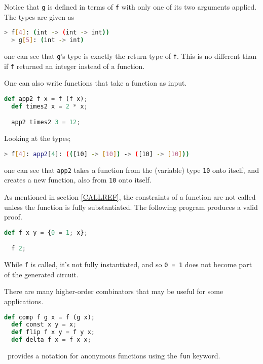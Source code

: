 Notice that \lstinline{g} is defined in terms of \lstinline{f} with only one of its two arguments applied. The types are given as

\begin{lstlisting}[language=bash]
  > f[4]: (int -> (int -> int))
  > g[5]: (int -> int)
\end{lstlisting}

one can see that \lstinline{g}'s type is exactly the return type of \lstinline{f}. This is no different than if \lstinline{f} returned an integer instead of a function.

One can also write functions that take a function as input.

\begin{lstlisting}[language=Python]
  def app2 f x = f (f x);
  def times2 x = 2 * x;

  app2 times2 3 = 12;
\end{lstlisting}

Looking at the types;

\begin{lstlisting}[language=bash]
  > f[4]: app2[4]: (([10] -> [10]) -> ([10] -> [10]))
\end{lstlisting}

one can see that \lstinline{app2} takes a function from the (variable) type \lstinline{10} onto itself, and creates a new function, also from \lstinline{10} onto itself.

As mentioned in section \ref{CALLREF}, the constraints of a function are not called unless the function is fully substantiated. The following program produces a valid proof.

\begin{lstlisting}[language=Python]
  def f x y = {0 = 1; x};

  f 2;
\end{lstlisting}

While \lstinline{f} is called, it's not fully instantiated, and so \lstinline{0 = 1} does not become part of the generated circuit.

There are many higher-order combinators that may be useful for some applications.

\begin{lstlisting}[language=Python]
  def comp f g x = f (g x);
  def const x y = x;
  def flip f x y = f y x;
  def delta f x = f x x;
\end{lstlisting}

\vampir\ provides a notation for anonymous functions using the \lstinline{fun} keyword.

